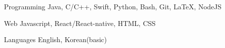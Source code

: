 

\begin{cvskills}

  \cvskill
    {Programming} %
    {Java, C/C++, Swift, Python, Bash, Git, LaTeX, NodeJS} %

  \cvskill
    {Web} %
    {Javascript, React/React-native, HTML, CSS} %

  \cvskill
    {Languages} %
	{English, Korean(basic)} %

\end{cvskills}
